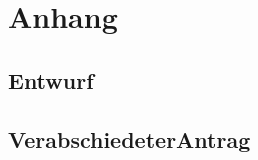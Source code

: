 \documentclass[12pt,a4paper]{scrartcl}
\begin{document}
\section*{Anhang}
\subsection*{Entwurf} \label{An:1}

\subsection*{VerabschiedeterAntrag} \label{An:2}

\end{document}
